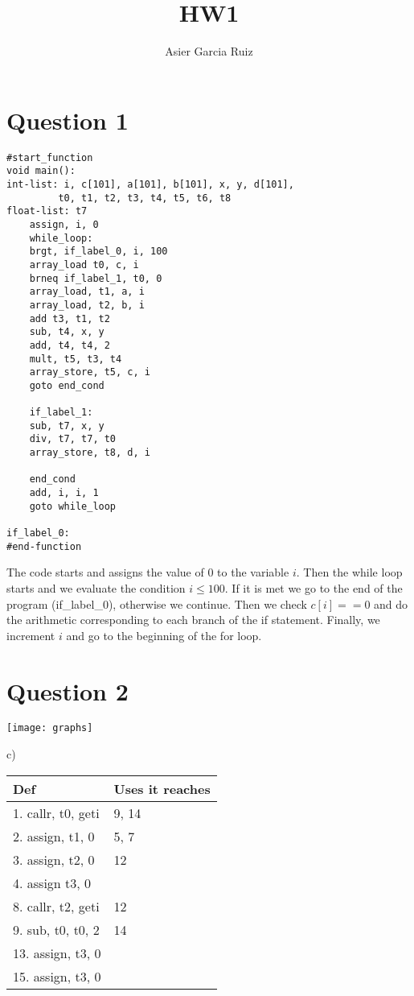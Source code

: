 \documentclass{article}
\title{HW1}
\author{Asier Garcia Ruiz}
\begin{document}
\maketitle

\section*{Question 1}

\begin{lstlisting}
#start_function
void main():
int-list: i, c[101], a[101], b[101], x, y, d[101],
         t0, t1, t2, t3, t4, t5, t6, t8
float-list: t7
    assign, i, 0
    while_loop:
    brgt, if_label_0, i, 100
    array_load t0, c, i
    brneq if_label_1, t0, 0
    array_load, t1, a, i
    array_load, t2, b, i
    add t3, t1, t2
    sub, t4, x, y
    add, t4, t4, 2
    mult, t5, t3, t4
    array_store, t5, c, i 
    goto end_cond
    
    if_label_1:
    sub, t7, x, y
    div, t7, t7, t0
    array_store, t8, d, i

    end_cond
    add, i, i, 1
    goto while_loop

if_label_0:
#end-function
\end{lstlisting}

The code starts and assigns the value of 0 to the variable $i$. Then
the while loop starts and we evaluate the condition $i \leq 100$. If
it is met we go to the end of the program (if\_label\_0), otherwise we continue.
Then we check $c[i] == 0$ and do the arithmetic corresponding to each
branch of the if statement. Finally, we increment $i$ and go to the
beginning of the for loop.

\section*{Question 2}

\texttt{[image: graphs]}

c)
\begin{center}
    \begin{tabular}{| l | l |}
        \hline
        Def                & Uses it reaches \\
        \hline
        1. callr, t0, geti & 9, 14           \\
        \hline
        2. assign, t1, 0   & 5, 7            \\
        \hline
        3. assign, t2, 0   & 12              \\
        \hline
        4. assign t3, 0    &                 \\
        \hline
        8. callr, t2, geti & 12              \\
        \hline
        9. sub, t0, t0, 2  & 14              \\
        \hline
        13. assign, t3, 0  &                 \\
        \hline
        15. assign, t3, 0  &                 \\
        \hline
    \end{tabular}
\end{center}
\end{document}
